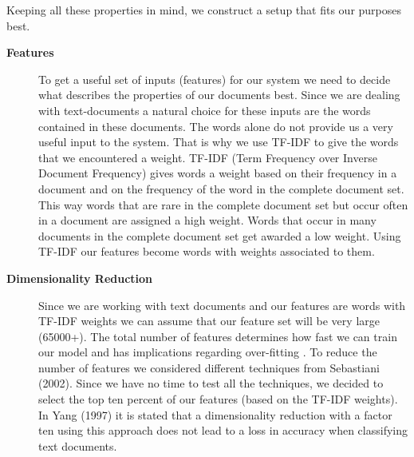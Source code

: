 Keeping all these properties in mind, we construct a setup that fits our purposes best.


\begin{description}
\item[\textbf{Features}] 
To get a useful set of inputs (features) for our system we need to decide what describes the properties of our documents best. Since we are dealing with text-documents a natural choice for these inputs are the words contained in these documents. 
The words alone do not provide us a very useful input to the system. That is why we use TF-IDF to give the words that we encountered a weight. TF-IDF (Term Frequency over Inverse Document Frequency) gives words a weight based on their frequency in a document and on the frequency of the word in the complete document set. This way words that are rare in the complete document set but occur often in a document are assigned a high weight. Words that occur in many documents in the complete document set get awarded a low weight\cite{ramos_tfidf}.
Using TF-IDF our features become words with weights associated to them.

\item[\textbf{Dimensionality Reduction}]
Since we are working with text documents and our features are words with TF-IDF weights we can assume that our feature set will be very large (65000+). The total number of features determines how fast we can train our model and has implications regarding over-fitting \cite{ml_text}. To reduce the number of features we considered different techniques from Sebastiani (2002)\cite{ml_text}. Since we have no time to test all the techniques, we decided to select the top ten percent of our features (based on the TF-IDF weights). In Yang (1997) \cite{yang1997} it is stated that a dimensionality reduction with a factor ten using this approach does not lead to a loss in accuracy when classifying text documents. 


\end{description}
